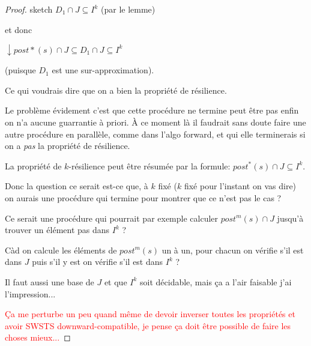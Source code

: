 \begin{proof}{sketch}
$D_1  \cap J \subseteq I^k$	(par le lemme)

et donc

$\downarrow post*(s) \cap J \subseteq D_1  \cap J \subseteq I^k$

(puisque $D_1$ est une sur-approximation).

Ce qui voudrais dire que on a bien la propriété de résilience.


Le problème évidement c'est que cette procédure ne termine peut être pas enfin on n'a aucune guarrantie à priori. À ce moment là il faudrait sans doute faire une autre procédure en parallèle, comme dans l'algo forward, et qui elle terminerais si on a {\em pas} la propriété de résilience.

 La propriété de $k$-résilience peut être résumée par la formule: $post^*(s) \cap J \subseteq I^k$.

Donc la question ce serait est-ce que, à $k$ fixé ($k$ fixé pour l'instant on vas dire) on aurais une procédure qui termine pour montrer que ce n'est pas le cas ?

Ce serait une procédure qui pourrait par exemple calculer $post^m(s) \cap J $ jusqu'à trouver un élément pas dans $I^k$ ?

Càd on calcule les éléments de $post^m(s)$ un à un, pour chacun on vérifie s’il est dans $J$ puis s’il y est on vérifie s’il est dans $I^k$ ?

Il faut aussi une base de $J$ et que $I^k$ soit décidable, mais ça a l'air faisable j'ai l'impression...


\textcolor{red}{Ça me perturbe un peu quand même de devoir inverser toutes les propriétés et avoir SWSTS downward-compatible, je pense ça doit être possible de faire les choses mieux...}



\end{proof}



